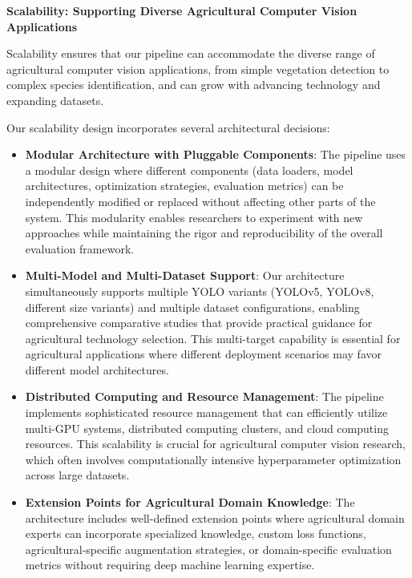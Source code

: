 \textbf{Scalability: Supporting Diverse Agricultural Computer Vision Applications}

Scalability ensures that our pipeline can accommodate the diverse range of agricultural computer vision applications, from simple vegetation detection to complex species identification, and can grow with advancing technology and expanding datasets.

Our scalability design incorporates several architectural decisions:

\begin{itemize}
    \item \textbf{Modular Architecture with Pluggable Components}: The pipeline uses a modular design where different components (data loaders, model architectures, optimization strategies, evaluation metrics) can be independently modified or replaced without affecting other parts of the system. This modularity enables researchers to experiment with new approaches while maintaining the rigor and reproducibility of the overall evaluation framework.
    
    \item \textbf{Multi-Model and Multi-Dataset Support}: Our architecture simultaneously supports multiple YOLO variants (YOLOv5, YOLOv8, different size variants) and multiple dataset configurations, enabling comprehensive comparative studies that provide practical guidance for agricultural technology selection. This multi-target capability is essential for agricultural applications where different deployment scenarios may favor different model architectures.
    
    \item \textbf{Distributed Computing and Resource Management}: The pipeline implements sophisticated resource management that can efficiently utilize multi-GPU systems, distributed computing clusters, and cloud computing resources. This scalability is crucial for agricultural computer vision research, which often involves computationally intensive hyperparameter optimization across large datasets.
    
    \item \textbf{Extension Points for Agricultural Domain Knowledge}: The architecture includes well-defined extension points where agricultural domain experts can incorporate specialized knowledge, custom loss functions, agricultural-specific augmentation strategies, or domain-specific evaluation metrics without requiring deep machine learning expertise.
\end{itemize}

